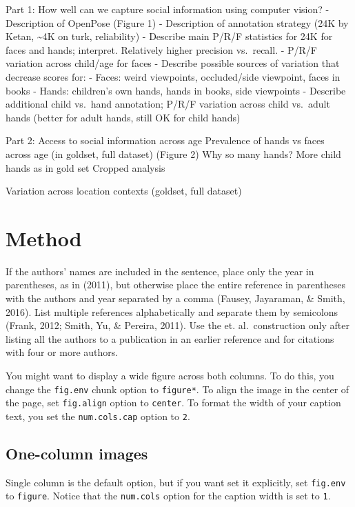 \documentclass[10pt, letterpaper]{article}
\begin{document}
Part 1: How well can we capture social information using computer
vision? - Description of OpenPose (Figure 1) - Description of annotation
strategy (24K by Ketan, \textasciitilde{}4K on turk, reliability) -
Describe main P/R/F statistics for 24K for faces and hands; interpret.
Relatively higher precision vs.~recall. - P/R/F variation across
child/age for faces - Describe possible sources of variation that
decrease scores for: - Faces: weird viewpoints, occluded/side viewpoint,
faces in books - Hands: children's own hands, hands in books, side
viewpoints - Describe additional child vs.~hand annotation; P/R/F
variation across child vs.~adult hands (better for adult hands, still OK
for child hands)

Part 2: Access to social information across age Prevalence of hands vs
faces across age (in goldset, full dataset) (Figure 2) Why so many
hands? More child hands as in gold set Cropped analysis

Variation across location contexts (goldset, full dataset)

\hypertarget{method}{%
\section{Method}\label{method}}

If the authors' names are included in the sentence, place only the year
in parentheses, as in (2011), but otherwise place the entire reference
in parentheses with the authors and year separated by a comma (Fausey,
Jayaraman, \& Smith, 2016). List multiple references alphabetically and
separate them by semicolons (Frank, 2012; Smith, Yu, \& Pereira, 2011).
Use the et. al.~construction only after listing all the authors to a
publication in an earlier reference and for citations with four or more
authors.

You might want to display a wide figure across both columns. To do this,
you change the \texttt{fig.env} chunk option to \texttt{figure*}. To
align the image in the center of the page, set \texttt{fig.align} option
to \texttt{center}. To format the width of your caption text, you set
the \texttt{num.cols.cap} option to \texttt{2}.

\hypertarget{one-column-images}{%
\subsection{One-column images}\label{one-column-images}}

Single column is the default option, but if you want set it explicitly,
set \texttt{fig.env} to \texttt{figure}. Notice that the
\texttt{num.cols} option for the caption width is set to \texttt{1}.
\end{document}

